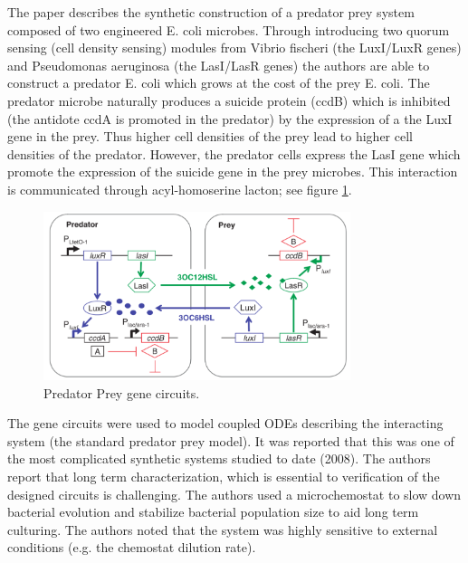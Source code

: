 \documentclass[float=false, crop=false]{standalone}
\begin{document}
	The paper \cite{Balagadde2008} describes the synthetic construction of a predator prey system composed of two engineered E. coli microbes. Through introducing two quorum sensing (cell density sensing) modules from Vibrio fischeri (the LuxI/LuxR genes) and Pseudomonas aeruginosa (the LasI/LasR genes) the authors are able to construct a predator E. coli which grows at the cost of the prey E. coli. The predator microbe naturally produces a suicide protein (ccdB) which is inhibited (the antidote ccdA is promoted in the predator) by the expression of a the LuxI gene in the prey. Thus higher cell densities of the prey lead to higher cell densities of the predator. However, the predator cells express the LasI gene which promote the expression of the suicide gene in the prey microbes. This interaction is communicated through acyl-homoserine lacton; see figure \ref{fig:balagadde2008_genecircuits}.  
	\begin{figure}[H]
		\centering
		\includegraphics[width=0.8\textwidth]{balagadde2008_genecircuits.png}
		\caption{Predator Prey gene circuits.}
		\label{fig:balagadde2008_genecircuits}
	\end{figure}
	The gene circuits were used to model coupled ODEs describing the interacting system (the standard predator prey model). It was reported that this was one of the most complicated synthetic systems studied to date (2008). The authors report that long term characterization, which is essential to verification of the designed circuits is challenging. The authors used a microchemostat to slow down bacterial evolution and stabilize bacterial population size to aid long term culturing. The authors noted that the system was highly sensitive to external conditions (e.g. the chemostat dilution rate). 

	\ifstandalone
			
		
	\fi
	
\end{document}
